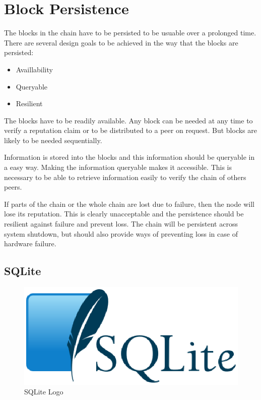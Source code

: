 \section{Block Persistence}
The blocks in the chain have to be persisted to be usuable over a prolonged time.
There are several design goals to be achieved in the way that the blocks are persisted:
\begin{itemize}
    \item Availlability
    \item Queryable
    \item Resilient
\end{itemize}

The blocks have to be readily available.
Any block can be needed at any time to verify a reputation claim
or to be distributed to a peer on request.
But blocks are likely to be needed sequentially.

Information is stored into the blocks and this information should be queryable in a easy way.
Making the information queryable makes it accessible.
This is necessary to be able to retrieve information easily to verify the chain of others peers.

If parts of the chain or the whole chain are lost due to failure,
then the node will lose its reputation.
This is clearly unacceptable and the persistence should be resilient against failure
and prevent loss.
The chain will be persistent across system shutdown,
but should also provide ways of preventing loss in case of hardware failure.

\subsection{SQLite}
\begin{figure}
	\centerline{\includegraphics[scale=0.3]{design/figs/SQLite370.eps}}
	\caption{SQLite Logo}
	\label{fig:SQLite-logo}
\end{figure}

